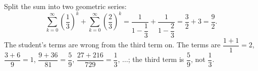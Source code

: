 Split the sum into two geometric series:
\[
\sum_{k=0}^{\infty}\left(\dfrac{1}{3}\right)^k+\sum_{k=0}^{\infty}\left(\dfrac{2}{3}\right)^k=\dfrac{1}{1-\dfrac{1}{3}}+\dfrac{1}{1-\dfrac{2}{3}}=\dfrac{3}{2}+3=\boxed{\dfrac{9}{2}}.
\]
The student's terms are wrong from the third term on. The terms are $\dfrac{1+1}{1}=2$, $\dfrac{3+6}{9}=1$, $\dfrac{9+36}{81}=\dfrac{5}{9}$, $\dfrac{27+216}{729}=\dfrac{1}{3}$, $\dots$; the third term is $\dfrac{5}{9}$, not $\dfrac{1}{3}$.
